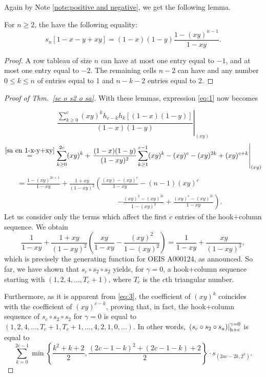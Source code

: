\documentclass[twoside]{article}
\renewcommand{\hcZ}[1]{\left.\left(#1\right)\right|_{\textnormal{h+c}}^{\gamma=0}}
\begin{document}
Again by Note \ref{note:positive and negative}, we get the following lemma.
\begin{lem}\label{sa en 1-x-y+xy}
For $n\ge2$, the have the following equality: 
\[
s_n[1-x-y+xy] =(1-x)(1-y)\frac{1-(xy)^{n-1}}{1-xy}.
\]
\end{lem}
\begin{proof}
    A row tableau of size $n$ can have at most one entry equal to $-1$, and at most one entry equal to $-2$. The remaining cells $n-2$ can have and any number $0\le k\le n$ of entries equal to 1 and $n-k-2$ entries equal to 2.
\end{proof}
\begin{proof}[Proof of Thm.~\ref{sc o s2 o sa}]
With these lemmas, expression \eqref{eq:1} now becomes

\begin{equation}\label{eq:3}
    \left.\frac{\sum_{k\ge0}^{c} (xy)^k h_{c-k}h_{k}[(1-x)(1-y)]}{(1-x)(1-y)}\right|_{(xy)}
\end{equation}
\begin{equation}\label{eq:4}
    \stackrel{\ref{sa en 1-x-y+xy}}{=} \sum_{k\ge0}^{2c} (xy)^k +\left.\frac{(1-x)(1-y)}{(1-xy)^2} \sum_{k\ge1}^{c-1} (xy)^k-(xy)^{c}-(xy)^{2k}+(xy)^{c+k}\right|_{(xy)}
\end{equation}
\begin{gather*}
    = \frac{1-(xy)^{2c+1}}{1-xy} + \frac{1+xy}{(1-xy)^2}\left( \frac{(xy)-(xy)^{c}}{1-xy} - (n-1)(xy)^{c} \right.
    \hspace{7em}
    \\ \hspace{14em} %
    \left.    -\frac{(xy)^2-(xy)^{2c}}{1-(xy)^2}+\frac{(xy)^{c}-(xy)^{2c}}{1-xy}\right).
\end{gather*}
Let us consider only the terms which affect the first $c$ entries of the hook+column sequence. We obtain
\[
    \frac{1}{1-xy} + \frac{1+xy}{(1-xy)^2}\left(\frac{xy}{1-xy} - \frac{(xy)^2}{1-(xy)^2}\right)
    = \frac{1}{1-xy} + \frac{xy}{(1-xy)^3},
\]
which is precisely the generating function for OEIS A000124, as announced.
So far, we have shown that $s_c\circ s_2\circ s_2$ yields, for $\gamma=0$, a hook+column sequence starting with $(1, 2, 4, \ldots, T_c+1)$, where $T_c$ is the $c$th triangular number.

Furthermore, as it is apparent from \eqref{eq:3}, the coefficient of $(xy)^k$ coincides with the coefficient of $(xy)^{c-k}$, proving that, in fact,
the hook+column sequence of $s_c\circ s_2\circ s_2$ for $\gamma=0$ is equal to \((1, 2, 4, \ldots, T_c+1, T_c+1, \ldots, 4, 2, 1, 0, \ldots)\). In other words,
$ \hcZ{s_c\circ s_2\circ s_a}$ is equal to
\[
 \sum\limits_{k=0}^{2c-1}\min\left\{\frac{k^2+k+2}{2},\frac{(2c-1-k)^2+(2c-1-k)+2}{2}\right\}\cdot s_{(2ac-2k, 2^k)}.
\]


\end{proof}
\end{document}
